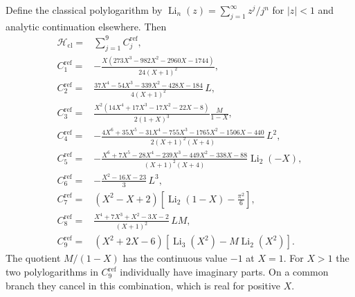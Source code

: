 Define the classical polylogarithm by
$\operatorname{Li}_n(z)=\sum_{j=1}^\infty z^j/j^n$ for $|z|<1$
and analytic continuation elsewhere. Then
\begin{align}
 \mathcal H_{\mathrm{cl}}={}&\sum_{j=1}^{9}C^{\mathrm{ref}}_j,\\
 C^{\mathrm{ref}}_1={}&-\frac{X(273X^3-982X^2-2960X-1744)}{24(X+1)^2},\\
 C^{\mathrm{ref}}_2={}&\frac{37X^4-54X^3-339X^2-428X-184}{4(X+1)^2}\,L,\\
 C^{\mathrm{ref}}_3={}&\frac{X^2(14X^4+17X^3-17X^2-22X-8)}{2(1+X)^3}
                                      \frac{M}{1-X},\\
 C^{\mathrm{ref}}_4={}&-\frac{4X^6+35X^5-31X^4-755X^3-1765X^2-1506X-440}
                    {2(X+1)^2(X+4)}\,L^2,\\
 C^{\mathrm{ref}}_5={}&-\frac{X^6+7X^5-28X^4-239X^3-449X^2-338X-88}
                    {(X+1)^2(X+4)}\operatorname{Li}_2(-X),\\
 C^{\mathrm{ref}}_6={}&-\frac{X^2-16X-23}{3}\,L^3,\\
 C^{\mathrm{ref}}_7={}&(X^2-X+2)\left[\operatorname{Li}_2(1-X)-\frac{\pi^2}{6}\right],\\
 C^{\mathrm{ref}}_8={}&\frac{X^4+7X^3+X^2-3X-2}{(X+1)^2}\,LM,\\
 C^{\mathrm{ref}}_9={}&(X^2+2X-6)
       [\operatorname{Li}_3(X^2)-M\operatorname{Li}_2(X^2)].
\end{align}
The quotient $M/(1-X)$ has the continuous value $-1$ at $X=1$.
For $X>1$ the two polylogarithms in $C^{\mathrm{ref}}_9$ individually have
imaginary parts. On a common branch they cancel in this
combination, which is real for positive $X$.

